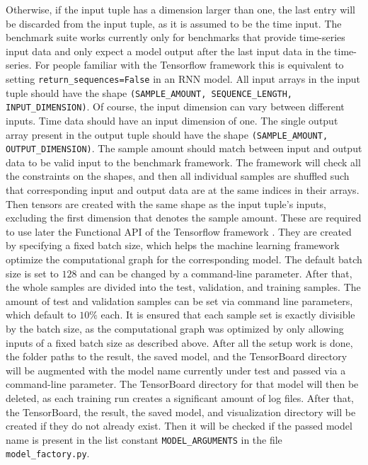 \documentclass[draft,final]{vutinfth} %
\begin{document}
    Otherwise, if the input tuple has a dimension larger than one, the last entry will be discarded from the input tuple, as it is assumed to be the time input.
    The benchmark suite works currently only for benchmarks that provide time-series input data and only expect a model output after the last input data in the time-series.
    For people familiar with the Tensorflow framework \cite{Tensorflow} this is equivalent to setting \texttt{return\_sequences=False} in an RNN model.
    All input arrays in the input tuple should have the shape \texttt{(SAMPLE\_AMOUNT, SEQUENCE\_LENGTH, INPUT\_DIMENSION)}.
    Of course, the input dimension can vary between different inputs. Time data should have an input dimension of one. 
    The single output array present in the output tuple should have the shape \texttt{(SAMPLE\_AMOUNT, OUTPUT\_DIMENSION)}.
    The sample amount should match between input and output data to be valid input to the benchmark framework.
    The framework will check all the constraints on the shapes, and then all individual samples are shuffled such that corresponding input and output data are at the same indices in their arrays.
    Then tensors are created with the same shape as the input tuple's inputs, excluding the first dimension that denotes the sample amount.
    These are required to use later the Functional API of the Tensorflow framework \cite{Tensorflow}.
    They are created by specifying a fixed batch size, which helps the machine learning framework optimize the computational graph for the corresponding model.
    The default batch size is set to $128$ and can be changed by a command-line parameter.
    After that, the whole samples are divided into the test, validation, and training samples. The amount of test and validation samples can be set via command line parameters, which default to $10\%$ each. 
    It is ensured that each sample set is exactly divisible by the batch size, as the computational graph was optimized by only allowing inputs of a fixed batch size as described above.
    After all the setup work is done, the folder paths to the result, the saved model, and the TensorBoard directory will be augmented with the model name currently under test and passed via a command-line parameter.
    The TensorBoard directory for that model will then be deleted, as each training run creates a significant amount of log files.
    After that, the TensorBoard, the result, the saved model, and visualization directory will be created if they do not already exist. 
    Then it will be checked if the passed model name is present in the list constant \texttt{MODEL\_ARGUMENTS} in the file \texttt{model\_factory.py}.
\end{document}
